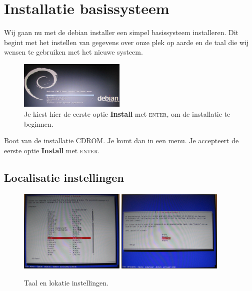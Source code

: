 \documentclass[12pt,a4paper]{article}
\begin{document}
\section{Installatie basissysteem}
Wij gaan nu met de debian installer een simpel basissysteem installeren. Dit begint met het instellen van gegevens over onze plek op aarde en de taal die wij wensen te gebruiken met het nieuwe systeem.

\begin{figure}[H]
\centering
\includegraphics[width=0.45\textwidth]{bootmenu}
\caption{Je kiest hier de eerste optie \textbf{Install} met \textsc{enter}, om de installatie te beginnen. }
\label{fig:taal-keuze-scherm}
\end{figure}

Boot van de installatie CDROM. Je komt dan in een menu.
Je accepteert de eerste optie \textbf{Install} met \textsc{enter}.


\subsection{Localisatie instellingen}
\begin{figure}[H]
\centering
\includegraphics[width=0.45\textwidth]{taal-keuze-scherm}
\includegraphics[width=0.45\textwidth]{lokatie-keuze-scherm}
\caption{Taal en lokatie instellingen.}
\label{fig:taal-keuze-scherm}
\end{figure}
\end{document}
